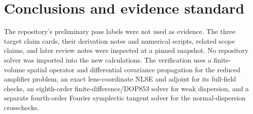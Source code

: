 \documentclass[11pt,a4paper]{article}
\begin{document}
\section{Conclusions and evidence standard}

The repository's preliminary pass labels were not used as evidence. The three target claim cards, their derivation notes and numerical scripts, related scope claims, and later review notes were inspected at a pinned snapshot. No repository solver was imported into the new calculations. The verification uses a finite-volume spatial operator and differential covariance propagation for the reduced amplifier problem, an exact lens-coordinate NLSE and adjoint for its full-field checks, an eighth-order finite-difference/DOP853 solver for weak dispersion, and a separate fourth-order Fourier symplectic tangent solver for the normal-dispersion crosschecks.
\end{document}
